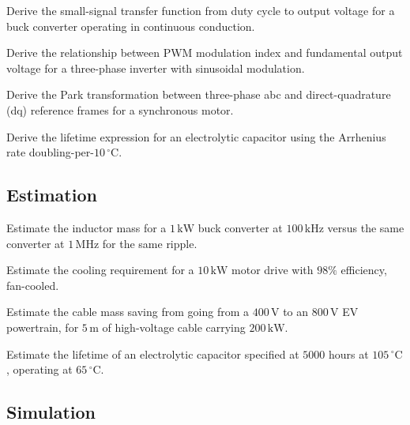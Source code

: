 \begin{exercise}
Derive the small-signal transfer function from duty cycle to output voltage for a buck converter operating in continuous conduction.
\end{exercise}

\begin{exercise}
Derive the relationship between PWM modulation index and fundamental output voltage for a three-phase inverter with sinusoidal modulation.
\end{exercise}

\begin{exercise}
Derive the Park transformation between three-phase abc and direct-quadrature (dq) reference frames for a synchronous motor.
\end{exercise}

\begin{exercise}
Derive the lifetime expression for an electrolytic capacitor using the Arrhenius rate doubling-per-$10\,^\circ\text{C}$.
\end{exercise}

\subsection*{Estimation}

\begin{exercise}
Estimate the inductor mass for a $1\,\text{kW}$ buck converter at $100\,\text{kHz}$ versus the same converter at $1\,\text{MHz}$ for the same ripple.
\end{exercise}

\begin{exercise}
Estimate the cooling requirement for a $10\,\text{kW}$ motor drive with $98\%$ efficiency, fan-cooled.
\end{exercise}

\begin{exercise}
Estimate the cable mass saving from going from a $400\,\text{V}$ to an $800\,\text{V}$ EV powertrain, for $5\,\text{m}$ of high-voltage cable carrying $200\,\text{kW}$.
\end{exercise}

\begin{exercise}
Estimate the lifetime of an electrolytic capacitor specified at $5000$ hours at $105\,^\circ\text{C}$, operating at $65\,^\circ\text{C}$.
\end{exercise}

\subsection*{Simulation}

